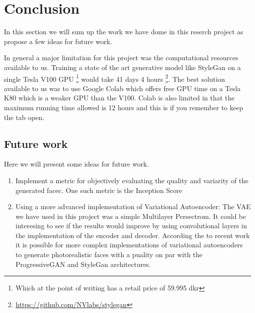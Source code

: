 
\section{Conclusion}


In this section we will sum up the work we have dome in this reserch project as propose a few ideas for future work.

In general a major limitation for this project was the computational resources available to us.  
Training a state of the art generative model like StyleGan on a single Tesla V100 GPU \footnote{Which at the point of writing has a retail price of 59.995 dkr} would take 41 days 4 hours \footnote{\url{https://github.com/NVlabs/stylegan}}. 
The best solution available to us was to use Google Colab which offers free GPU time on a Tesla K80 which is a weaker GPU than the V100. Colab is also limited in that the maximum running time allowed is 12 hours and this is if you remember to keep the tab open.



\subsection{Future work}
Here we will present some ideas for future work. 

\begin{enumerate}
    \item Implement a metric for objectively evaluating the quality and variarity of the generated facec. One such metric is the Inception Score
    
    \item Using a more advanced implementation of Variational Autoencoder: The VAE we have used in this project was a simple Multilayer Persectrom. It could be interesing to see if the results would improve by using convolutional layers in the implementation of the encoder and decoder.  According the to recent work \cite{vqvae2} it is possible for more complex implementations of variational autoencoders to generate photorealistic faces with a puality on par with the ProgressiveGAN and StyleGan architectures.
\end{enumerate}